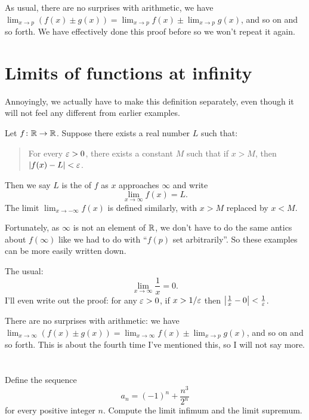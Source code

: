 As usual, there are no surprises with arithmetic,
we have $\lim_{x \to p} (f(x) \pm g(x))
	= \lim_{x \to p} f(x) \pm \lim_{x \to p} g(x)$,
and so on and so forth.
We have effectively done this proof before
so we won't repeat it again.

\section{Limits of functions at infinity}
Annoyingly, we actually have to make this
definition separately,
even though it will not feel any different
from earlier examples.
\begin{definition}
	Let $f \colon \mathbb R \to \mathbb R$.
	Suppose there exists a real number $L$ such that:
	\begin{quote}
		For every $\varepsilon > 0$, there exists a constant $M$
		such that if $x > M$, then $\left\lvert f(x)-L \right\rvert < \varepsilon$.
	\end{quote}
	Then we say $L$ is the  of $f$ as
	$x$ approaches $\infty$ and write
	\[ \lim_{x \to \infty} f(x) = L. \]
	The limit $\lim_{x \to -\infty} f(x)$ is defined similarly,
	with $x > M$ replaced by $x < M$.
\end{definition}
Fortunately, as $\infty$ is not an element of $\mathbb R$,
we don't have to do the same antics about $f(\infty)$
like we had to do with ``$f(p)$ set arbitrarily''.
So these examples can be more easily written down.
\begin{example}
	The usual:
	\[ \lim_{x \to \infty} \frac 1x = 0. \]
	I'll even write out the proof:
	for any $\varepsilon > 0$, if $x > 1/\varepsilon$
	then $\left\lvert \frac 1x - 0 \right\rvert < \frac1{\varepsilon}$.
\end{example}

There are no surprises with arithmetic:
we have $\lim_{x \to \infty} (f(x) \pm g(x))
	= \lim_{x \to \infty} f(x) \pm \lim_{x \to p} g(x)$,
and so on and so forth.
This is about the fourth time
I've mentioned this, so I will not say more.

\section{\problemhead}

\begin{problem}
	Define the sequence
	\[ a_n = (-1)^n + \frac{n^3}{2^n} \]
	for every positive integer $n$.
	Compute the limit infimum and the limit supremum.
\end{problem}

